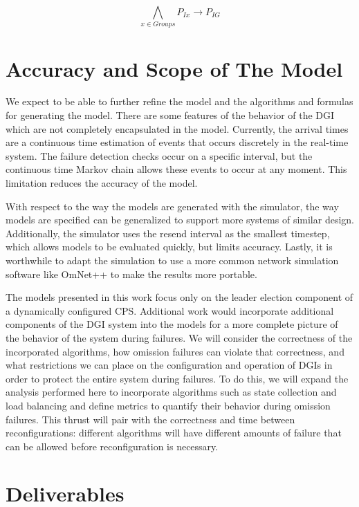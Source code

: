 \begin{equation}
\bigwedge_{x \in Groups}P_{Ix} \rightarrow P_{IG}
\end{equation}


\section{Accuracy and Scope of The Model}

We expect to be able to further refine the model and the algorithms and formulas for generating the model.
There are some features of the behavior of the DGI which are not completely encapsulated in the model.
Currently, the arrival times are a continuous time estimation of events that occurs discretely in the real-time system.
The failure detection checks occur on a specific interval, but the continuous time Markov chain allows these events to occur at any moment.
This limitation reduces the accuracy of the model.

With respect to the way the models are generated with the simulator, the way models are specified can be generalized to support more systems of similar design.
Additionally, the simulator uses the resend interval as the smallest timestep, which allows models to be evaluated quickly, but limits accuracy.
Lastly, it is worthwhile to adapt the simulation to use a more common network simulation software like OmNet++\cite{OMNET} to make the results more portable.

The models presented in this work focus only on the leader election component of a dynamically configured CPS.
Additional work would incorporate additional components of the DGI system into the models for a more complete picture of the behavior of the system during failures.
We will consider the correctness of the incorporated algorithms, how omission failures can violate that correctness, and what restrictions we can place on the configuration and operation of DGIs in order to protect the entire system during failures.
To do this, we will expand the analysis performed here to incorporate algorithms such as state collection and load balancing and define metrics to quantify their behavior during omission failures.
This thrust will pair with the correctness and time between reconfigurations: different algorithms will have different amounts of failure that can be allowed before reconfiguration is necessary.

\section{Deliverables}

